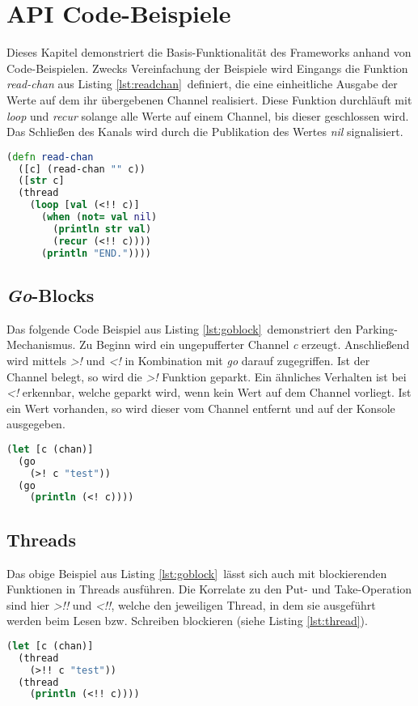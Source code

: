 \section{\acs{API} Code-Beispiele}
Dieses Kapitel demonstriert die Basis-Funktionalität des Frameworks anhand von Code-Beispielen. Zwecks Vereinfachung der Beispiele wird Eingangs die Funktion \textit{read-chan} aus Listing \ref{lst:readchan}\ definiert, die eine einheitliche Ausgabe der Werte auf dem ihr übergebenen Channel realisiert. Diese Funktion durchläuft mit \textit{loop} und \textit{recur} solange alle Werte auf einem Channel, bis dieser geschlossen wird. Das Schließen des Kanals wird durch die Publikation des Wertes \textit{nil} signalisiert.
\begin{lstlisting}[language=Clojure,caption=\textit{read-chan} Hilfsfunktion,label=lst:readchan]
(defn read-chan
  ([c] (read-chan "" c))
  ([str c]
  (thread
    (loop [val (<!! c)]
      (when (not= val nil)
        (println str val)
        (recur (<!! c))))
      (println "END."))))
\end{lstlisting}
\subsection{\textit{Go}-Blocks}
Das folgende Code Beispiel aus Listing \ref{lst:goblock}\ demonstriert den Parking-Mechanismus. Zu Beginn wird  ein ungepufferter Channel \textit{c} erzeugt. Anschließend wird mittels \textit{>!} und \textit{<!} in Kombination mit \textit{go} darauf zugegriffen. Ist der Channel belegt, so wird die \textit{>!} Funktion geparkt. Ein ähnliches Verhalten ist bei \textit{<!} erkennbar, welche geparkt wird, wenn kein Wert auf dem Channel vorliegt. Ist ein Wert vorhanden, so wird dieser vom Channel entfernt und auf der Konsole ausgegeben.
\begin{lstlisting}[language=Clojure,caption=\textit{Go}-Blocks,label=lst:goblock]
(let [c (chan)]
  (go
    (>! c "test"))
  (go
    (println (<! c))))
\end{lstlisting}
\subsection{Threads}
Das obige Beispiel aus Listing \ref{lst:goblock}\ lässt sich auch mit blockierenden Funktionen in Threads ausführen. Die Korrelate zu den Put- und Take-Operation sind hier \textit{>!!} und \textit{<!!}, welche den jeweiligen Thread, in dem sie ausgeführt werden beim Lesen bzw. Schreiben blockieren (siehe Listing \ref{lst:thread}).
\begin{lstlisting}[language=Clojure,caption=Thread,label=lst:thread]
(let [c (chan)]
  (thread
    (>!! c "test"))
  (thread
    (println (<!! c))))
\end{lstlisting}
